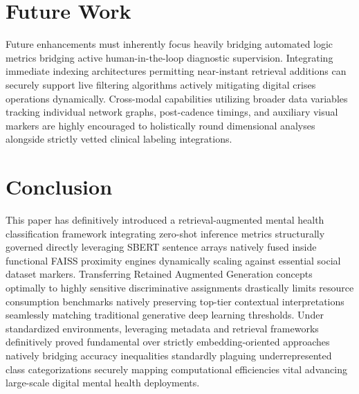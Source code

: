 \documentclass[11pt]{article}
\begin{document}
\section{Future Work}

Future enhancements must inherently focus heavily bridging automated logic metrics bridging active human-in-the-loop diagnostic supervision. Integrating immediate indexing architectures permitting near-instant retrieval additions can securely support live filtering algorithms actively mitigating digital crises operations dynamically. Cross-modal capabilities utilizing broader data variables tracking individual network graphs, post-cadence timings, and auxiliary visual markers are highly encouraged to holistically round dimensional analyses alongside strictly vetted clinical labeling integrations.

\section{Conclusion}

This paper has definitively introduced a retrieval-augmented mental health classification framework integrating zero-shot inference metrics structurally governed directly leveraging SBERT sentence arrays natively fused inside functional FAISS proximity engines dynamically scaling against essential social dataset markers. Transferring Retained Augmented Generation concepts optimally to highly sensitive discriminative assignments drastically limits resource consumption benchmarks natively preserving top-tier contextual interpretations seamlessly matching traditional generative deep learning thresholds. Under standardized environments, leveraging metadata and retrieval frameworks definitively proved fundamental over strictly embedding-oriented approaches natively bridging accuracy inequalities standardly plaguing underrepresented class categorizations securely mapping computational efficiencies vital advancing large-scale digital mental health deployments.
\end{document}
